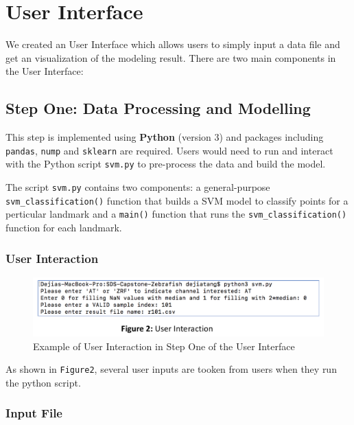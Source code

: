 \documentclass[10pt,letterpaper]{article}
\begin{document}
\section{User Interface}\label{user-interface}

We created an User Interface which allows users to simply input a data
file and get an visualization of the modeling result. There are two main
components in the User Interface:

\subsection{Step One: Data Processing and
Modelling}\label{step-one-data-processing-and-modelling}

This step is implemented using \textbf{Python} (version 3) and packages
including \texttt{pandas}, \texttt{nump} and \texttt{sklearn} are
required. Users would need to run and interact with the Python script
\texttt{svm.py} to pre-process the data and build the model.

The script \texttt{svm.py} contains two components: a general-purpose
\texttt{svm\_classification()} function that builds a SVM model to
classify points for a perticular landmark and a \texttt{main()} function
that runs the \texttt{svm\_classification()} function for each landmark.

\subsubsection{User Interaction}\label{user-interaction}

\begin{figure}[h]
\includegraphics[width=4.85in]{figures/Figure2} \caption{Example of User Interaction in Step One of the User Interface}\label{fig:useri}
\end{figure}

As shown in \texttt{Figure2}, several user inputs are tooken from users
when they run the python script.

\subsubsection{Input File}\label{input-file}
\end{document}
